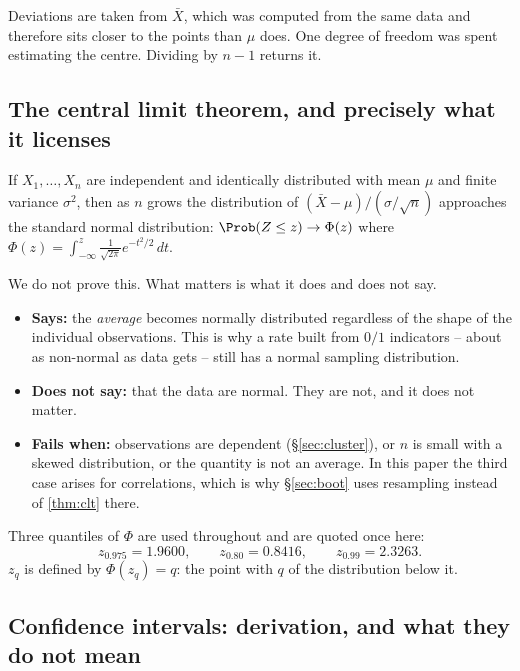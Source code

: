  Deviations are taken from $\bar X$, which was computed
from the same data and therefore sits closer to the points than $\mu$ does. One
degree of freedom was spent estimating the centre. Dividing by $n-1$ returns it.

\subsection{The central limit theorem, and precisely what it licenses}

\begin{theorem}
\label{thm:clt}
If $X_1,\dots,X_n$ are independent and identically distributed with mean $\mu$
and finite variance $\sigma^2$, then as $n$ grows the distribution of
$(\bar X - \mu)/(\sigma/\sqrt n)$ approaches the standard normal distribution:
$\Prob(Z \le z) \to \Phi(z)$ where
$\Phi(z) = \int_{-\infty}^{z}\frac{1}{\sqrt{2\pi}}e^{-t^2/2}\,dt$.
\end{theorem}

We do not prove this. What matters is what it does and does not say.

\begin{itemize}
\item \textbf{Says:} the \emph{average} becomes normally distributed regardless of
      the shape of the individual observations. This is why a rate built from
      $0/1$ indicators -- about as non-normal as data gets -- still has a normal
      sampling distribution.
\item \textbf{Does not say:} that the data are normal. They are not, and it does
      not matter.
\item \textbf{Fails when:} observations are dependent (§\ref{sec:cluster}), or
      $n$ is small with a skewed distribution, or the quantity is not an average.
      In this paper the third case arises for correlations, which is why
      §\ref{sec:boot} uses resampling instead of \cref{thm:clt} there.
\end{itemize}

\noindent Three quantiles of $\Phi$ are used throughout and are quoted once here:
\begin{equation}
z_{0.975} = 1.9600,\qquad z_{0.80} = 0.8416,\qquad z_{0.99} = 2.3263 .
\label{eq:quantiles}
\end{equation}
$z_q$ is defined by $\Phi(z_q)=q$: the point with $q$ of the distribution below it.

\subsection{Confidence intervals: derivation, and what they do not mean}
\label{sec:ci}

